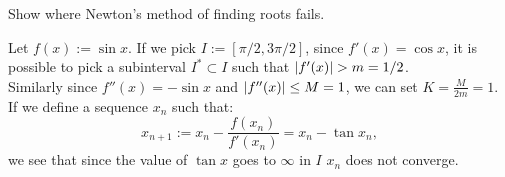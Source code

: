 \documentclass[boxes, qed]{homework}
\DeclarePairedDelimiter\abs{\lvert}{\rvert}%
\begin{document}
\begin{problem}Show where Newton's method of finding roots fails.
\end{problem}
\begin{solution}Let $f(x):=\sin{x}$. If we pick $I:=[\pi/2, 3\pi/2]$,
  since $f'(x)=\cos{x}$, it is possible to pick a subinterval $I^* \subset I$ such that
  $\abs{f'(x)}>m=1/2$.\\
  Similarly since $f''(x)=-\sin{x}$ and $\abs{f''(x)}\le M=1$, we can set $K=\frac{M}{2m}=1$.
  If we define a sequence $x_n$ such that:
  $$x_{n+1}:=x_n-\frac{f(x_n)}{f'(x_n)}=x_n-\tan{x_n},$$
  we see that since the value of $\tan{x}$ goes to $\infty$ in $I$
  $x_n$ does not converge.
\end{solution}
\end{document}
